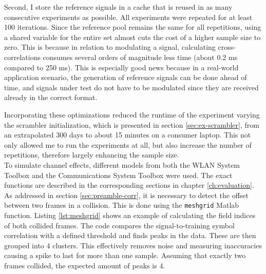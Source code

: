 Second, I store the reference signals in a cache that is reused in as many consecutive experiments as possible. All experiments were repeated for at least 100 iterations. Since the reference pool remains the same for all repetitions, using a shared variable for the entire set almost cuts the cost of a higher sample size to zero. This is because in relation to modulating a signal, calculating cross-correlations consumes several orders of magnitude less time (about 0.2 ms compared to 250 ms). This is especially good news because in a real-world application scenario, the generation of reference signals can be done ahead of time, and signals under test do not have to be modulated since they are received already in the correct format.

Incorporating these optimizations reduced the runtime of the experiment varying the scrambler initialization, which is presented in section \ref{sec:ex-scrambler}, from an extrapolated 300 days to about 15 minutes on a consumer laptop. This not only allowed me to run the experiments at all, but also increase the number of repetitions, therefore largely enhancing the sample size.\\

To simulate channel effects, different models from both the WLAN System Toolbox and the Communications System Toolbox \cite{commtoolbox} were used. The exact functions are described in the corresponding sections in chapter \ref{ch:evaluation}.\\

As addressed in section \ref{sec:preamble-corr}, it is necessary to detect the offset between two frames in a collision. This is done using the \texttt{meshgrid} Matlab function. Listing \ref{lst:meshgrid} shows an example of calculating the field indices of both collided frames. The code compares the signal-to-training symbol correlation with a defined threshold and finds peaks in the data. These are then grouped into 4 clusters. This effectively removes noise and measuring inaccuracies causing a spike to last for more than one sample. Assuming that exactly two frames collided, the expected amount of peaks is 4.

